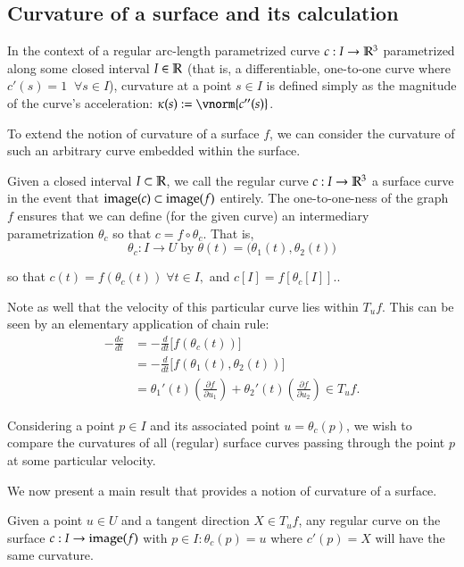 \subsection{Curvature of a surface and its calculation}
In the context of a regular arc-length parametrized curve $c: I \to \mathbb{R}^3$ parametrized along some closed interval $I\in \mathbb{R}$
 (that is, a differentiable, one-to-one curve where $c'(s) = 1 \;\; \forall s \in I$), curvature at a point $s \in I$ is defined simply as the magnitude of the curve's acceleration: $\kappa(s) := \vnorm{c''(s)}$.
 
 To extend the notion of curvature of a surface $f$, we can consider the curvature of such an arbitrary curve embedded within the surface.
 
 \begin{defn} \label{def:curve-on-a-surface}
 	Given a closed interval $I \subset \mathbb{R}$, we call the regular curve
 	$c: I \to \mathbb{R}^3$ a surface curve in the event that $\mathrm{image}(c) \subset \mathrm{image}(f)$ entirely. The one-to-one-ness of the graph $f$ ensures that we can define (for the given curve) an intermediary parametrization $\theta_c$  so that
 	$ c = f \circ \theta_c $. That is,
 	\[
 	\theta_c : I \to U \; \textrm{by} \; \theta(t) = \big(\theta_1(t), \theta_2(t)\big)
 	\]
 	
 	so that $c(t) = f(\theta_c(t)) \;\forall t\in I,$
 	and $c[I] = f\left[\theta_c[I]\right].$.
 \end{defn}
 Note as well that the velocity of this particular curve lies within $T_u f$. This
 can be seen by an elementary application of chain rule:
 \begin{align}
 -\frac{d c}{dt} &= -\frac{d}{dt}\big[ f(\theta_c(t))\big] \\
 &= -\frac{d}{dt}\big[f(\theta_1(t), \theta_2(t))\big] \\
 &= \theta_1'(t)\left( \frac{\partial f}{\partial u_1} \right) + 
 \theta_2'(t)\left( \frac{\partial f}{\partial u_2} \right) \in T_uf.
 \end{align}
 
 Considering a point $p \in I$ and its associated point $u = \theta_c(p)$, we wish to compare the curvatures of all (regular) surface curves passing through the point $p$ at some particular velocity.
 
 We now present a main result that provides a notion of curvature of a surface.

	\begin{theorem} \label{thm:meusnier}
		Given a point $u \in U $ and a tangent direction $X \in T_u f$,
  any regular curve on the surface $c: I \to \mathrm{image}(f)$ with $p\in I : \theta_c(p) = u$
  where $c'(p) = X$ will have the same curvature.
	\end{theorem}
	
